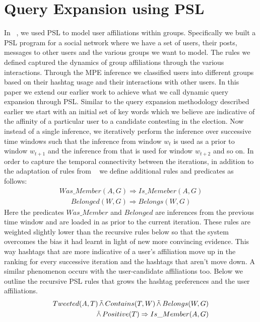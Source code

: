 \section{Query Expansion using PSL}
In ~\cite{huang2012social}, we used PSL to model user affiliations within groups. 
Specifically we built a PSL program for a  social network where we have a set of users, their posts, messages to other users and the various groups we want to model. 
The rules we defined captured the dynamics of group affiliations through the various interactions.
Through the MPE inference we classified users into different groups based on their hashtag usage and their interactions with other users.
\newline
In this paper we extend our earlier work to achieve what we call dynamic query expansion through PSL. 
Similar to the query expansion methodology described earlier we start with an initial set of key words which we believe are indicative of the affinity of a particular user to a candidate contesting in the election.
Now instead of a single inference, we iteratively perform the inference over successive time windows such that the inference from window $w_t$ is used as a prior to window $w_{t+1}$ and the inference from that is used for window $w_{t+2}$ and so on.
In order to capture the temporal connectivity between the iterations, in addition to the adaptation of rules from ~\cite{huang2012social} we define additional rules and predicates as follows:
\begin{align*}
Was\_Member(A,G) \Rightarrow Is\_Memeber(A,G)
\end{align*}
\begin{align*}
Belonged(W,G) \Rightarrow Belongs(W,G)
\end{align*}
Here the predicates $Was\_Member$ and $Belonged$ are inferences from the previous time window and are loaded in as  prior to the current iteration.
These rules are weighted slightly lower than the recursive rules below so that the system overcomes the bias it had learnt in light of new more convincing evidence.
This way hashtags that are more indicative of a user's affiliation move up in the ranking for every successive iteration and the hashtags that aren't move down.
A similar phenomenon occurs with the user-candidate affiliations too.
Below we outline the recursive PSL rules that grows the hashtag preferences and the user affiliations. 
\begin{align*}
\begin{split}
Tweeted(A,T) 
	\softand Contains(T,W)
	\softand Belongs(W,G) \\ 
	\softand Positive(T)
	\Rightarrow Is\_Member(A,G)
\end{split}
\end{align*}

